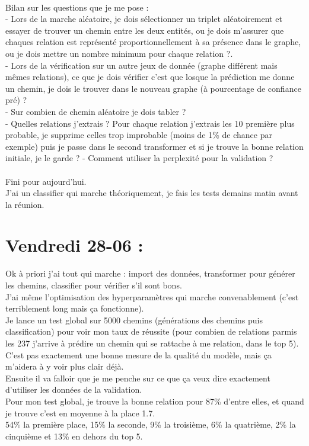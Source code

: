 \documentclass{article}
\begin{document}
\\
Bilan sur les questions que je me pose :\\
- Lors de la marche aléatoire, je dois sélectionner un triplet aléatoirement et essayer de trouver un chemin entre les deux entités, ou je dois m'assurer que chaques relation est représenté proportionnellement à sa présence dans le graphe, ou je dois mettre un nombre minimum pour chaque relation ?.\\
- Lors de la vérification sur un autre jeux de donnée (graphe différent mais mêmes relations), ce que je dois vérifier c'est que losque la prédiction me donne un chemin, je dois le trouver dans le nouveau graphe (à pourcentage de confiance pré) ?\\
- Sur combien de chemin aléatoire je dois tabler ?\\
- Quelles relations j'extrais ? Pour chaque relation j'extrais les 10 première plus probable, je supprime celles trop improbable (moins de 1\% de chance par exemple) puis je passe dans le second transformer et si je trouve la bonne relation initiale, je le garde ?
- Comment utiliser la perplexité pour la validation ?\\\\
Fini pour aujourd'hui.\\
J'ai un classifier qui marche théoriquement, je fais les tests demains matin avant la réunion.\\
\section*{Vendredi 28-06 :}
Ok à priori j'ai tout qui marche : import des données, transformer pour générer les chemins, classifier pour vérifier s'il sont bons.\\
J'ai même l'optimisation des hyperparamètres qui marche convenablement (c'est terriblement long mais ça fonctionne).\\
Je lance un test global sur 5000 chemins (générations des chemins puis classification) pour voir mon taux de réussite (pour combien de relations parmis les 237 j'arrive à prédire un chemin qui se rattache à me relation, dans le top 5).\\
C'est pas exactement une bonne mesure de la qualité du modèle, mais ça m'aidera à y voir plus clair déjà.\\
Ensuite il va falloir que je me penche sur ce que ça veux dire exactement d'utiliser les données de la validation.\\
Pour mon test global, je trouve la bonne relation pour 87\% d'entre elles, et quand je trouve c'est en moyenne à la place 1.7.\\
54\% la première place, 15\% la seconde, 9\% la troisième, 6\% la quatrième, 2\% la cinquième et 13\% en dehors du top 5.\\
\end{document}
